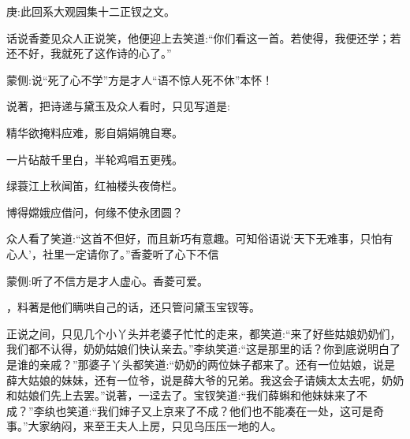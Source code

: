 

\begin{parag}
    \begin{note}庚:此回系大观园集十二正钗之文。\end{note}
\end{parag}


\begin{parag}
    话说香菱见众人正说笑，他便迎上去笑道:“你们看这一首。若使得，我便还学；若还不好，我就死了这作诗的心了。”\begin{note}蒙侧:说“死了心不学”方是才人“语不惊人死不休”本怀！\end{note}说著，把诗递与黛玉及众人看时，只见写道是:
\end{parag}


\begin{poem}
    \begin{pl}精华欲掩料应难，影自娟娟魄自寒。\end{pl}

    \begin{pl}一片砧敲千里白，半轮鸡唱五更残。\end{pl}

    \begin{pl}绿蓑江上秋闻笛，红袖楼头夜倚栏。\end{pl}

    \begin{pl}博得嫦娥应借问，何缘不使永团圆？\end{pl}


\end{poem}


\begin{parag}
    众人看了笑道:“这首不但好，而且新巧有意趣。可知俗语说‘天下无难事，只怕有心人’，社里一定请你了。”香菱听了心下不信\begin{note}蒙侧:听了不信方是才人虚心。香菱可爱。\end{note}，料著是他们瞒哄自己的话，还只管问黛玉宝钗等。
\end{parag}


\begin{parag}
    正说之间，只见几个小丫头并老婆子忙忙的走来，都笑道:“来了好些姑娘奶奶们，我们都不认得，奶奶姑娘们快认亲去。”李纨笑道:“这是那里的话？你到底说明白了是谁的亲戚？”那婆子丫头都笑道:“奶奶的两位妹子都来了。还有一位姑娘，说是薛大姑娘的妹妹，还有一位爷，说是薛大爷的兄弟。我这会子请姨太太去呢，奶奶和姑娘们先上去罢。”说著，一迳去了。宝钗笑道:“我们薛蝌和他妹妹来了不成？”李纨也笑道:“我们婶子又上京来了不成？他们也不能凑在一处，这可是奇事。”大家纳闷，来至王夫人上房，只见乌压压一地的人。
\end{parag}


